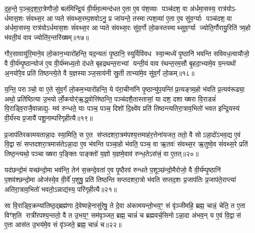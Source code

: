 द॒ह॒न्ते॒ प॒ञ्च॒द॒श॒रा॒त्रेणौजो॒ बल॑मिन्द्रि॒यं वी॒र्य॑मा॒त्मन्द॑धत ए॒ता ए॒व प॑श॒व्याः पञ्च॑दश॒ वा अ॑र्धमा॒सस्य॒ रात्र॑योऽ- र्धमास॒शः सं॑वथ्स॒र आप्यते संवथ्स॒रम्प॒शवोऽनु॒ प्र जा॑यन्ते॒ तस्मात्पश॒व्या॑ ए॒ता ए॒व सु॑व॒र्ग्याः पञ्च॑दश॒ वा अ॑र्धमा॒सस्य॒ रात्र॑योऽर्धमास॒शः सं॑वथ्स॒र आप्यते संवथ्स॒रः सु॑व॒र्गो लो॒कस्तस्माथ्सुव॒र्ग्या ज्योति॒र्गौरायु॒रिति॑ त्र्य॒हो भ॑वती॒यं वाव ज्योति॑र॒न्तरि॑ख्षम्॥१७॥

गौर॒सावायु॑रि॒माने॒व लो॒कान॒भ्यारो॑हन्ति॒ यद॒न्यतः॑ पृ॒ष्ठानि॒ स्युर्विवि॑वध स्या॒न्मध्ये॑ पृ॒ष्ठानि॑ भवन्ति सविवध॒त्वायौजो॒ वै वी॒र्य॑म्पृ॒ष्ठान्योज॑ ए॒व वी॒र्य॑म्मध्य॒तो द॑धते बृहद्रथन्त॒राभ्यां यन्ती॒यं वाव र॑थन्त॒रम॒सौ बृ॒हदा॒भ्यामे॒व य॒न्त्यथो॑ अ॒नयो॑रे॒व प्रति॑ तिष्ठन्त्ये॒ते वै य॒ज्ञस्याञ्ज॒साय॑नी स्रु॒ती ताभ्या॑मे॒व सु॑व॒र्गं लो॒कम्॥१८॥

य॒न्ति॒ पराञ्चो॒ वा ए॒ते सु॑व॒र्गं लो॒कम॒भ्यारो॑हन्ति॒ ये प॑रा॒चीना॑नि पृ॒ष्ठान्यु॑प॒यन्ति॑ प्र॒त्यङ्त्र्य॒हो भ॑वति प्र॒त्यव॑रूढ्या॒ अथो॒ प्रति॑ष्ठित्या उ॒भयोर्लो॒कयोर्॑ऋ॒द्ध्वोत्ति॑ष्ठन्ति॒ पञ्च॑दशै॒तास्तासां॒ या दश॒ दशाख्षरा वि॒राडन्नं॑ वि॒राड्वि॒राजै॒वान्नाद्य॒- मव॑ रुन्धते॒ याः पञ्च॒ पञ्च॒ दिशो॑ दि॒क्ष्वे॑व प्रति॑ तिष्ठन्त्यतिरा॒त्राव॒भितो॑ भवत इन्द्रि॒यस्य॑ वी॒र्य॑स्य प्र॒जायै॑ पशू॒नाम्परि॑गृहीत्यै॥१९॥

{\anuvakamend[{ग॒च्छ॒न्त्य॒ग्नि॒ष्टुता॑ पा॒प्मान॒न्निर॒न्तरि॑ख्षल्लोँ॒कम्प्र॒जायै॒ द्वे च॑॥७॥}]}

प्र॒जाप॑तिरकामयतान्ना॒दः स्या॒मिति॒ स ए॒त स॑प्तदशरा॒त्रम॑पश्य॒त्तमाह॑र॒त्तेना॑यजत॒ ततो॒ वै सोऽन्ना॒दो॑ऽभव॒द्य ए॒वं वि॒द्वासः॑ सप्तदशरा॒त्रमास॑तेऽन्ना॒दा ए॒व भ॑वन्ति पञ्चा॒हो भ॑वति॒ पञ्च॒ वा ऋ॒तवः॑ संवथ्स॒र ऋ॒तुष्वे॒व सं॑वथ्स॒रे प्रति॑ तिष्ठ॒न्त्यथो॒ पञ्चाख्षरा प॒ङ्क्तिः पाङ्क्तो॑ य॒ज्ञो य॒ज्ञमे॒वाव॑ रुन्ध॒तेऽस॑त्त्रं॒ वा ए॒तत्॥२०॥

यद॑छन्दो॒मं यच्छ॑न्दो॒मा भव॑न्ति॒ तेन॑ स॒त्त्रन्दे॒वता॑ ए॒व पृ॒ष्ठैरव॑ रुन्धते प॒शूञ्छ॑न्दो॒मैरोजो॒ वै वी॒र्य॑म्पृ॒ष्ठानि॑ प॒शव॑श्छन्दो॒मा ओज॑स्ये॒व वी॒र्ये॑ प॒शुषु॒ प्रति॑ तिष्ठन्ति सप्तदशरा॒त्रो भ॑वति सप्तद॒शः प्र॒जाप॑तिः प्र॒जाप॑ते॒राप्त्या॑ अतिरा॒त्राव॒भितो॑ भवतो॒ऽन्नाद्य॑स्य॒ परि॑गृहीत्यै॥२१॥

{\anuvakamend[{ए॒तथ्स॒प्तत्रिꣳ॑श्चच्च॥८॥}]}

सा वि॒राड्वि॒क्रम्या॑तिष्ठ॒द्ब्रह्म॑णा दे॒वेष्वन्ने॒नासु॑रेषु॒ ते दे॒वा अ॑कामयन्तो॒भय॒ꣳ॒ सं वृ॑ञ्जीमहि॒ ब्रह्म॒ चान्नं॒ चेति॒ त ए॒ता विꣳ॑श॒ति रात्री॑रपश्य॒न्ततो॒ वै त उ॒भय॒ꣳ॒ सम॑वृञ्जत॒ ब्रह्म॒ चान्नं॑ च ब्रह्मवर्च॒सिनोऽन्ना॒दा अ॑भव॒न् य ए॒वं वि॒द्वास॑ ए॒ता आस॑त उ॒भय॑मे॒व सं वृ॑ञ्जते॒ ब्रह्म॒ चान्नं॑ च॥२२॥

